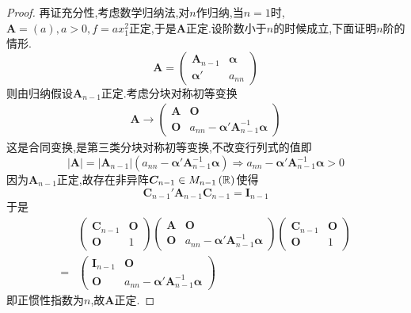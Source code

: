 {\begin{proof}
        再证充分性,考虑数学归纳法,对$n$作归纳,当$n=1$时,$\bm{A}=\left(a\right),a>0,f=ax_1^2$正定,于是$\bm{A}$正定.设阶数小于$n$的时候成立,下面证明$n$阶的情形.\[
            \bm{A}=\begin{pmatrix}
                \bm{A}_{n-1} & \bm{\alpha} \\
                \bm{\alpha}' & a_{nn}
            \end{pmatrix}
        \]则由归纳假设$\bm{A}_{n-1}$正定.考虑分块对称初等变换\begin{align*}
            \bm{A}\longrightarrow\begin{pmatrix}
                                     \bm{A} & \bm{O}                                          \\
                                     \bm{O} & a_{nn}-\bm{\alpha}'\bm{A}_{n-1}^{-1}\bm{\alpha}
                                 \end{pmatrix}
        \end{align*}这是合同变换,是第三类分块对称初等变换,不改变行列式的值即\[
            \left|\bm{A}\right|=\left|\bm{A}_{n-1}\right|\left(
            a_{nn}-\bm{\alpha}'\bm{A}_{n-1}^{-1}\bm{\alpha}
            \right)\Longrightarrow a_{nn}-\bm{\alpha}'\bm{A}_{n-1}^{-1}\bm{\alpha}>0
        \]因为$\bm{A}_{n-1}$正定,故存在非异阵$\bm{C}_{n-1}\in M_{n-1}\left(\mathbb{R} \right)$使得\[
            \bm{C}_{n-1}'\bm{A}_{n-1}\bm{C}_{n-1}=\bm{I}_{n-1}
        \]于是\begin{align*}
              & \begin{pmatrix}
                    \bm{C}_{n-1} & \bm{O} \\
                    \bm{O}       & 1
                \end{pmatrix}
            \begin{pmatrix}
                \bm{A} & \bm{O}                                          \\
                \bm{O} & a_{nn}-\bm{\alpha}'\bm{A}_{n-1}^{-1}\bm{\alpha}
            \end{pmatrix}
            \begin{pmatrix}
                \bm{C}_{n-1} & \bm{O} \\
                \bm{O}       & 1
            \end{pmatrix}                                              \\
            = & \begin{pmatrix}
                    \bm{I}_{n-1} & \bm{O}                                          \\
                    \bm{O}       & a_{nn}-\bm{\alpha}'\bm{A}_{n-1}^{-1}\bm{\alpha}
                \end{pmatrix}
        \end{align*}即正惯性指数为$n$,故$\bm{A}$正定.
    \end{proof}
}
